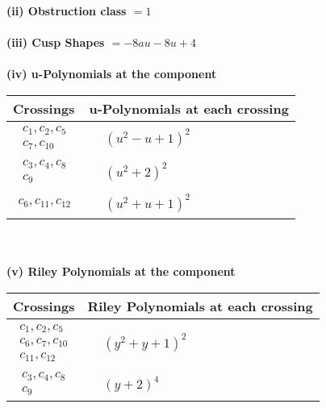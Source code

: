 \documentclass[1p]{elsarticle_modified}
\theoremstyle{definition}
\begin{document}
\flushleft \textbf{(ii) Obstruction class $= 1$}\\~\\
\flushleft \textbf{(iii) Cusp Shapes $= -8 a u-8 u+4$}\\~\\
\newpage\renewcommand{\arraystretch}{1}
\flushleft \textbf{(iv) u-Polynomials at the component}\newline \\
\begin{tabular}{m{50pt}|m{274pt}}
Crossings & \hspace{64pt}u-Polynomials at each crossing \\
\hline $$\begin{aligned}c_{1},c_{2},c_{5}\\c_{7},c_{10}\end{aligned}$$&$\begin{aligned}
&(u^2- u+1)^2
\end{aligned}$\\
\hline $$\begin{aligned}c_{3},c_{4},c_{8}\\c_{9}\end{aligned}$$&$\begin{aligned}
&(u^2+2)^2
\end{aligned}$\\
\hline $$\begin{aligned}c_{6},c_{11},c_{12}\end{aligned}$$&$\begin{aligned}
&(u^2+u+1)^2
\end{aligned}$\\
\hline
\end{tabular}\\~\\
\newpage\renewcommand{\arraystretch}{1}
\flushleft \textbf{(v) Riley Polynomials at the component}\newline \\
\begin{tabular}{m{50pt}|m{274pt}}
Crossings & \hspace{64pt}Riley Polynomials at each crossing \\
\hline $$\begin{aligned}c_{1},c_{2},c_{5}\\c_{6},c_{7},c_{10}\\c_{11},c_{12}\end{aligned}$$&$\begin{aligned}
&(y^2+y+1)^2
\end{aligned}$\\
\hline $$\begin{aligned}c_{3},c_{4},c_{8}\\c_{9}\end{aligned}$$&$\begin{aligned}
&(y+2)^4
\end{aligned}$\\
\hline
\end{tabular}\\~\\
\end{document}
